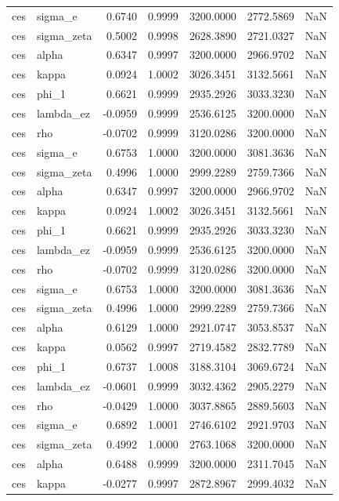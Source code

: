 \begin{tabular}{llrrrrl}
ces & sigma\_e & 0.6740 & 0.9999 & 3200.0000 & 2772.5869 & NaN \\
ces & sigma\_zeta & 0.5002 & 0.9998 & 2628.3890 & 2721.0327 & NaN \\
ces & alpha & 0.6347 & 0.9997 & 3200.0000 & 2966.9702 & NaN \\
ces & kappa & 0.0924 & 1.0002 & 3026.3451 & 3132.5661 & NaN \\
ces & phi\_1 & 0.6621 & 0.9999 & 2935.2926 & 3033.3230 & NaN \\
ces & lambda\_ez & -0.0959 & 0.9999 & 2536.6125 & 3200.0000 & NaN \\
ces & rho & -0.0702 & 0.9999 & 3120.0286 & 3200.0000 & NaN \\
ces & sigma\_e & 0.6753 & 1.0000 & 3200.0000 & 3081.3636 & NaN \\
ces & sigma\_zeta & 0.4996 & 1.0000 & 2999.2289 & 2759.7366 & NaN \\
ces & alpha & 0.6347 & 0.9997 & 3200.0000 & 2966.9702 & NaN \\
ces & kappa & 0.0924 & 1.0002 & 3026.3451 & 3132.5661 & NaN \\
ces & phi\_1 & 0.6621 & 0.9999 & 2935.2926 & 3033.3230 & NaN \\
ces & lambda\_ez & -0.0959 & 0.9999 & 2536.6125 & 3200.0000 & NaN \\
ces & rho & -0.0702 & 0.9999 & 3120.0286 & 3200.0000 & NaN \\
ces & sigma\_e & 0.6753 & 1.0000 & 3200.0000 & 3081.3636 & NaN \\
ces & sigma\_zeta & 0.4996 & 1.0000 & 2999.2289 & 2759.7366 & NaN \\
ces & alpha & 0.6129 & 1.0000 & 2921.0747 & 3053.8537 & NaN \\
ces & kappa & 0.0562 & 0.9997 & 2719.4582 & 2832.7789 & NaN \\
ces & phi\_1 & 0.6737 & 1.0008 & 3188.3104 & 3069.6724 & NaN \\
ces & lambda\_ez & -0.0601 & 0.9999 & 3032.4362 & 2905.2279 & NaN \\
ces & rho & -0.0429 & 1.0000 & 3037.8865 & 2889.5603 & NaN \\
ces & sigma\_e & 0.6892 & 1.0001 & 2746.6102 & 2921.9703 & NaN \\
ces & sigma\_zeta & 0.4992 & 1.0000 & 2763.1068 & 3200.0000 & NaN \\
ces & alpha & 0.6488 & 0.9999 & 3200.0000 & 2311.7045 & NaN \\
ces & kappa & -0.0277 & 0.9997 & 2872.8967 & 2999.4032 & NaN \\

\end{tabular}
